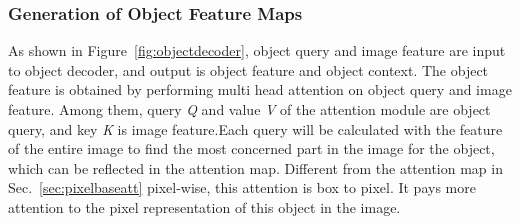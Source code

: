 %
%
%
%
%





\subsubsection{Generation of Object Feature Maps }

As shown in Figure~\ref{fig:objectdecoder}, object query and image feature are input to object decoder, and output is object feature and object context. The object feature is obtained by performing multi head attention on object query and image feature. Among them, query \textit{Q} and value \textit{V} of the attention module are object query, and key \textit{K} is image feature.Each query will be calculated with the feature of the entire image to find the most concerned part in the image for the object, which can be reflected in the attention map. Different from the attention map in Sec.~\ref{sec:pixelbaseatt} pixel-wise, this attention is box to pixel. It pays more attention to the pixel representation of this object in the image. 

